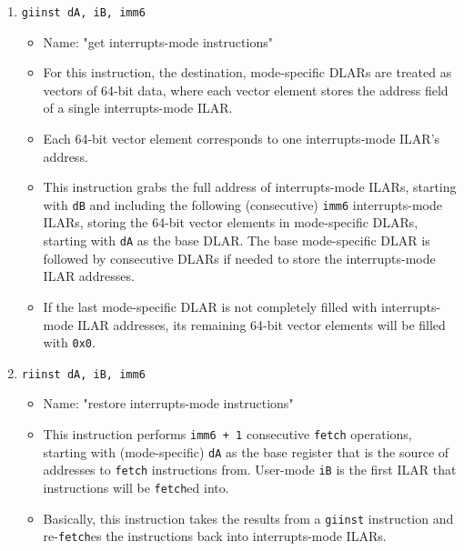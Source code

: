\documentclass{article}
\begin{document}
\begin{itemize}
\begin{enumerate}
			\item \texttt{giinst dA, iB, imm6}
				\begin{itemize}
				\item Name:  "get interrupts-mode instructions"
				\item For this instruction, the destination, mode-specific
					DLARs are treated as vectors of 64-bit data, where each
					vector element stores the address field of a single
					interrupts-mode ILAR.
				\item Each 64-bit vector element corresponds to one
					interrupts-mode ILAR's address.
				\item This instruction grabs the full address of
					interrupts-mode ILARs, starting with \texttt{dB} and
					including the following (consecutive) \texttt{imm6}
					interrupts-mode ILARs, storing the 64-bit vector
					elements in mode-specific DLARs, starting with
					\texttt{dA} as the base DLAR.  The base mode-specific
					DLAR is followed by consecutive DLARs if needed to
					store the interrupts-mode ILAR addresses.
				\item If the last mode-specific DLAR is not completely
					filled with interrupts-mode ILAR addresses, its
					remaining 64-bit vector elements will be filled with
					\texttt{0x0}.
				\end{itemize}
			\item \texttt{riinst dA, iB, imm6}
				\begin{itemize}
				\item Name:  "restore interrupts-mode instructions"
				\item This instruction performs \texttt{imm6 + 1}
					consecutive \texttt{fetch} operations, starting with
					(mode-specific) \texttt{dA} as the base register that
					is the source of addresses to \texttt{fetch}
					instructions from.  User-mode \texttt{iB} is the first
					ILAR that instructions will be \texttt{fetch}ed into.
				\item Basically, this instruction takes the results from
					a \texttt{giinst} instruction and re-\texttt{fetch}es
					the instructions back into interrupts-mode ILARs.
				\end{itemize}


\end{enumerate}
\end{itemize}
\end{document}
